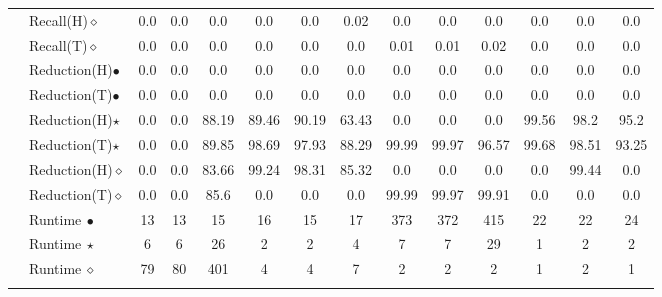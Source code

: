 \begin{tabular}{p{0.3em} p{6em} || ccc | ccc | ccc | ccc}
\cline{2-14}
& Recall(H)$\diamond$ & 0.0 & 0.0 & 0.0 & 0.0 & 0.0 & 0.02 & 0.0 & 0.0 & 0.0 & 0.0 & 0.0 & 0.0 \\
\cline{2-14}
& Recall(T)$\diamond$ & 0.0 & 0.0 & 0.0 & 0.0 & 0.0 & 0.0 & 0.01 & 0.01 & 0.02 & 0.0 & 0.0 & 0.0 \\
\cline{2-14}
& Reduction(H)$\bullet$ & 0.0 & 0.0 & 0.0 & 0.0 & 0.0 & 0.0 & 0.0 & 0.0 & 0.0 & 0.0 & 0.0 & 0.0 \\
\cline{2-14}
& Reduction(T)$\bullet$ & 0.0 & 0.0 & 0.0 & 0.0 & 0.0 & 0.0 & 0.0 & 0.0 & 0.0 & 0.0 & 0.0 & 0.0 \\
\cline{2-14}
& Reduction(H)$\star$ & 0.0 & 0.0 & 88.19 & 89.46 & 90.19 & 63.43 & 0.0 & 0.0 & 0.0 & 99.56 & 98.2 & 95.2 \\
\cline{2-14}
& Reduction(T)$\star$ & 0.0 & 0.0 & 89.85 & 98.69 & 97.93 & 88.29 & 99.99 & 99.97 & 96.57 & 99.68 & 98.51 & 93.25 \\
\cline{2-14}
& Reduction(H)$\diamond$ & 0.0 & 0.0 & 83.66 & 99.24 & 98.31 & 85.32 & 0.0 & 0.0 & 0.0 & 0.0 & 99.44 & 0.0 \\
\cline{2-14}
& Reduction(T)$\diamond$ & 0.0 & 0.0 & 85.6 & 0.0 & 0.0 & 0.0 & 99.99 & 99.97 & 99.91 & 0.0 & 0.0 & 0.0 \\
\cline{2-14}
& Runtime$\ \bullet$ & 13 & 13 & 15 & 16 & 15 & 17 & 373 & 372 & 415 & 22 & 22 & 24 \\
\cline{2-14}
& Runtime$\ \star$ & 6 & 6 & 26 & 2 & 2 & 4 & 7 & 7 & 29 & 1 & 2 & 2 \\
\cline{2-14}
& Runtime$\ \diamond$ & 79 & 80 & 401 & 4 & 4 & 7 & 2 & 2 & 2 & 1 & 2 & 1 \\
\cline{2-14}
\\[-5pt]\end{tabular}
\endgroup
